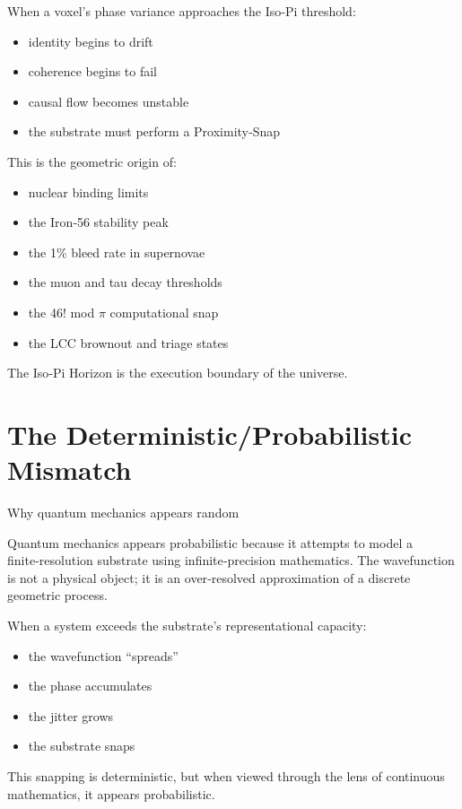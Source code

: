 \documentclass[reprint,amsmath,amssymb,aps,prl,floatfix]{revtex4-2}
\begin{document}
\begin{itemize}
When a voxel’s phase variance approaches the Iso‑Pi threshold:

\begin{itemize}
\item identity begins to drift  
\item coherence begins to fail  
\item causal flow becomes unstable  
\item the substrate must perform a Proximity‑Snap  
\end{itemize}

This is the geometric origin of:

\begin{itemize}
\item nuclear binding limits  
\item the Iron‑56 stability peak  
\item the 1\% bleed rate in supernovae  
\item the muon and tau decay thresholds  
\item the 46! mod $\pi$ computational snap  
\item the LCC brownout and triage states  
\end{itemize}
The Iso‑Pi Horizon is the execution boundary of the universe.

\section{The Deterministic/Probabilistic Mismatch}

Why quantum mechanics appears random

Quantum mechanics appears probabilistic because it attempts to model a finite‑resolution substrate using infinite‑precision mathematics. The wavefunction is not a physical object; it is an over‑resolved approximation of a discrete geometric process.

When a system exceeds the substrate’s representational capacity:

\begin{itemize}
\item the wavefunction “spreads”  
\item the phase accumulates  
\item the jitter grows  
\item the substrate snaps  
\end{itemize}

This snapping is deterministic, but when viewed through the lens of continuous mathematics, it appears probabilistic.


\end{itemize}
\end{document}
